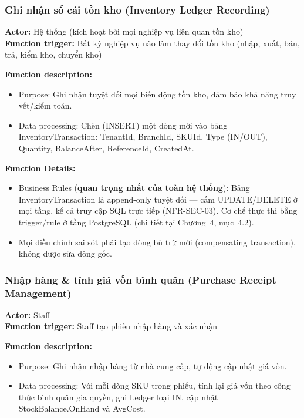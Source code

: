 \subsubsection{Ghi nhận sổ cái tồn kho (Inventory Ledger Recording)}
\textbf{Actor:} Hệ thống (kích hoạt bởi mọi nghiệp vụ liên quan tồn kho) \\
\textbf{Function trigger:} Bất kỳ nghiệp vụ nào làm thay đổi tồn kho (nhập, xuất, bán, trả, kiểm kho, chuyển kho)

\textbf{Function description:}
\begin{itemize}
    \item Purpose: Ghi nhận tuyệt đối mọi biến động tồn kho, đảm bảo khả năng truy vết/kiểm toán.
    \item Data processing: Chèn (INSERT) một dòng mới vào bảng InventoryTransaction: TenantId, BranchId, SKUId, Type (IN/OUT), Quantity, BalanceAfter, ReferenceId, CreatedAt.
\end{itemize}

\textbf{Function Details:}
\begin{itemize}
    \item Business Rules (\textbf{quan trọng nhất của toàn hệ thống}): Bảng InventoryTransaction là append-only tuyệt đối — cấm UPDATE/DELETE ở mọi tầng, kể cả truy cập SQL trực tiếp (NFR-SEC-03). Cơ chế thực thi bằng trigger/rule ở tầng PostgreSQL (chi tiết tại Chương~4, mục~4.2).
    \item Mọi điều chỉnh sai sót phải tạo dòng bù trừ mới (compensating transaction), không được sửa dòng gốc.
\end{itemize}

\subsubsection{Nhập hàng \& tính giá vốn bình quân (Purchase Receipt Management)}
\textbf{Actor:} Staff \\
\textbf{Function trigger:} Staff tạo phiếu nhập hàng và xác nhận

\textbf{Function description:}
\begin{itemize}
    \item Purpose: Ghi nhận nhập hàng từ nhà cung cấp, tự động cập nhật giá vốn.
    \item Data processing: Với mỗi dòng SKU trong phiếu, tính lại giá vốn theo công thức bình quân gia quyền, ghi Ledger loại IN, cập nhật StockBalance.OnHand và AvgCost.
\end{itemize}


